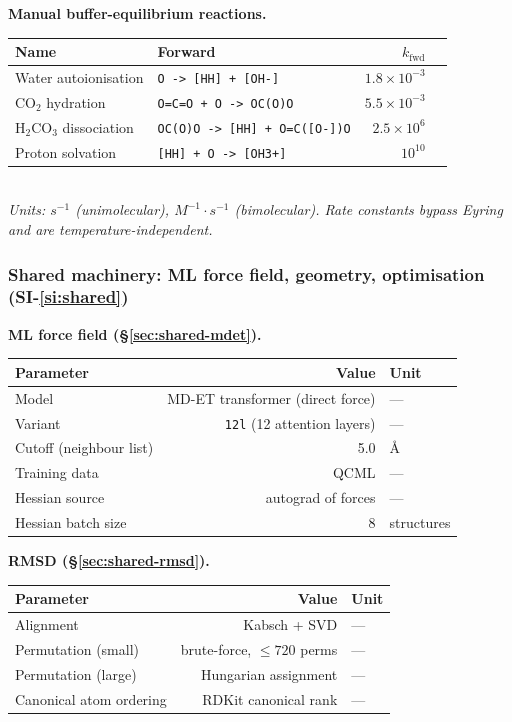 \bigskip

\noindent\textbf{Manual buffer-equilibrium reactions.}\par\nopagebreak
\noindent\begin{tabular}{p{4cm}p{5cm}rr}
\toprule
Name & Forward & $k_\text{fwd}$ \\
\midrule
Water autoionisation        & \texttt{O -> [HH] + [OH-]}              & $1.8 \times 10^{-3}$ \\
CO$_2$ hydration            & \texttt{O=C=O + O -> OC(O)O}            & $5.5 \times 10^{-3}$ \\
H$_2$CO$_3$ dissociation    & \texttt{OC(O)O -> [HH] + O=C([O-])O}    & $2.5 \times 10^{6}$ \\
Proton solvation            & \texttt{[HH] + O -> [OH3+]}             & $10^{10}$ \\
\bottomrule
\end{tabular}
\\[1ex]
\noindent\textit{Units: $\si{s^{-1}}$ (unimolecular), $\si{M^{-1}\cdot s^{-1}}$ (bimolecular). Rate constants bypass Eyring and are temperature-independent.}


\subsubsection{Shared machinery: ML force field, geometry, optimisation (SI-\ref{si:shared})}
\label{sec:params-shared}

\noindent\textbf{ML force field (\S\ref{sec:shared-mdet}).}\par\nopagebreak
\noindent\begin{tabular}{p{5cm}rl}
\toprule
Parameter & Value & Unit \\
\midrule
Model & MD-ET transformer (direct force) & --- \\
Variant & \texttt{12l} (12 attention layers) & --- \\
Cutoff (neighbour list) & 5.0 & \AA \\
Training data & QCML & --- \\
Hessian source & autograd of forces & --- \\
Hessian batch size & 8 & structures \\
\bottomrule
\end{tabular}

\bigskip

\noindent\textbf{RMSD (\S\ref{sec:shared-rmsd}).}\par\nopagebreak
\noindent\begin{tabular}{p{5cm}rl}
\toprule
Parameter & Value & Unit \\
\midrule
Alignment & Kabsch + SVD & --- \\
Permutation (small) & brute-force, $\leq 720$ perms & --- \\
Permutation (large) & Hungarian assignment & --- \\
Canonical atom ordering & RDKit canonical rank & --- \\
\bottomrule
\end{tabular}

